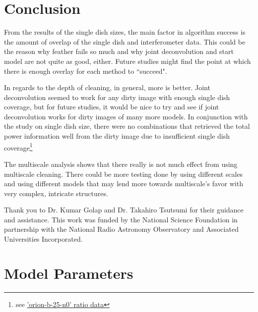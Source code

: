 \documentclass[manuscript,linenumbers]{aastex62}
\begin{document}

\section{Conclusion}

From the results of the single dish sizes, the main factor in algorithm success is the amount of overlap of the single dish and interferometer data. This could be the reason why feather fails so much and why joint deconvolution and start model are not quite as good, either. Future studies might find the point at which there is enough overlay for each method to ``succeed". 

In regards to the depth of cleaning, in general, more is better. Joint deconvolution seemed to work for any dirty image with enough single dish coverage, but for future studies, it would be nice to try and see if joint deconvolution works for dirty images of many more models. In conjunction with the study on single dish size, there were no combinations that retrieved the total power information well from the dirty image due to insufficient single dish coverage\footnote{see \href{https://gitlab.com/mileslucas/rica/blob/master/docs/static/ratios/orion-b-25-n0__model.csv}{'orion-b-25-n0' ratio data}}

The multiscale analysis shows that there really is not much effect from using multiscale cleaning. There could be more testing done by using different scales and using different models that may lend more towards multiscale's favor with very complex, intricate structures. 




\acknowledgments
Thank you to Dr. Kumar Golap and Dr. Takahiro Tsutsumi for their guidance and assistance. This work was funded by the National Science Foundation in partnership with the National Radio Astronomy Observatory and Associated Universities Incorporated.




\appendix
\section{Model Parameters}
\label{sec:models}
\end{document}
